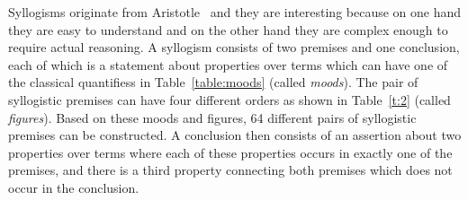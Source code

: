 \documentclass[12pt]{article}
\begin{document}
Syllogisms originate from Aristotle~\cite{aristotle} and
they are interesting because on one hand they are easy to understand and on the other hand
they are complex enough to require actual reasoning. 
A syllogism consists of two
premises and one conclusion,
each of which is a statement about properties over terms which can have one of the classical quantifiess in Table~\ref{table:moods} (called \emph{moods}). The pair of syllogistic premises can have four different orders as shown in Table~\ref{t:2} (called \emph{figures}). Based on these moods and figures, 64 different pairs of syllogistic premises can be constructed.
A conclusion then consists of an assertion about two properties over terms where each of these properties occurs in exactly one of the premises, and there is a third property connecting both premises which does not occur in the conclusion.
\end{document}
